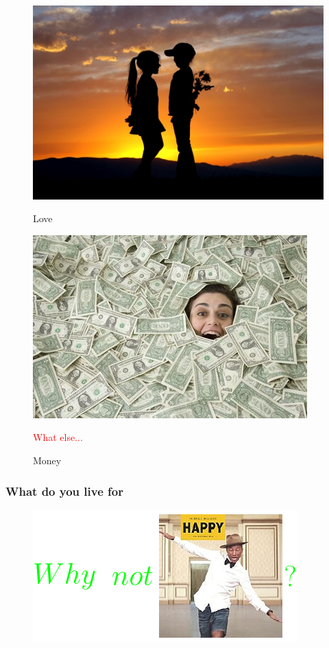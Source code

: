 \documentclass{beamer}
\begin{document}
\begin{frame}
\begin{figure}
\begin{minipage}{0.45\textwidth}
      \centering
      \includegraphics[width=.7\textwidth]{./img/love.jpg} 
      \caption{Love}
      \label{fig:sit-two}
    \end{minipage}\hfill
    \begin{minipage}{0.45\textwidth}
      \centering
      \includegraphics[width=.7\textwidth]{./img/money.jpg} 
      \caption{Money}
      \label{fig:sit-four}
    \end{minipage}
    

    \textcolor{red}{What else...}
  \end{figure}
\end{frame}
  
\begin{frame}
  \frametitle{What do you live for}
  \begin{figure}
    \includegraphics[scale=1.7]{./embed/whyHappy.pdf}
  \end{figure}
\end{frame}
\end{document}
